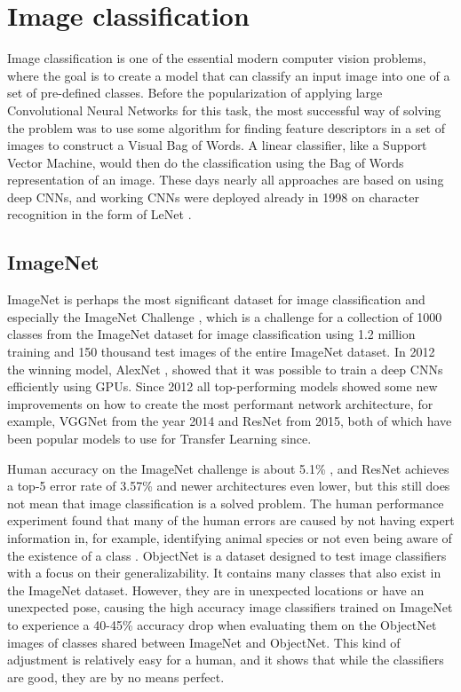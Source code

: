 \chapter{Image classification}
Image classification is one of the essential modern computer vision problems, where the goal is to create a model that can classify an input image into one of a set of pre-defined classes. Before the popularization of applying large Convolutional Neural Networks for this task, the most successful way of solving the problem was to use some algorithm for finding feature descriptors in a set of images to construct a Visual Bag of Words.  A linear classifier, like a Support Vector Machine, would then do the classification using the Bag of Words representation of an image. These days nearly all approaches are based on using deep CNNs, and working CNNs were deployed already in 1998 on character recognition in the form of LeNet \citep{leNet}.

\section{ImageNet}

ImageNet  \citep{imagenet}  is perhaps the most significant dataset for image classification and especially the ImageNet Challenge \citep{ILSVRC}, which is a challenge for a collection of 1000 classes from the ImageNet dataset for image classification using 1.2 million training and 150 thousand test images of the entire ImageNet dataset. In 2012 the winning model, AlexNet \citep{alexNet}, showed that it was possible to train a deep CNNs efficiently using GPUs. Since 2012 all top-performing models showed some new improvements on how to create the most performant network architecture, for example, VGGNet from the year 2014 and ResNet \citep{resNet} from 2015, both of which have been popular models to use for Transfer Learning since.

Human accuracy on the ImageNet challenge is about 5.1\% \citep{imageNet_summary}, and ResNet achieves a top-5 error rate of 3.57\% \citep{resNet} and newer architectures even lower, but this still does not mean that image classification is a solved problem. The human performance experiment found that many of the human errors are caused by not having expert information in, for example, identifying animal species or not even being aware of the existence of a class \citep{imageNet_summary}. ObjectNet \citep{objectNet} is a dataset designed to test image classifiers with a focus on their generalizability. It contains many classes that also exist in the ImageNet dataset. However, they are in unexpected locations or have an unexpected pose, causing the high accuracy image classifiers trained on ImageNet to experience a 40-45\% accuracy drop when evaluating them on the ObjectNet images of classes shared between ImageNet and ObjectNet. This kind of adjustment is relatively easy for a human, and it shows that while the classifiers are good, they are by no means perfect.

